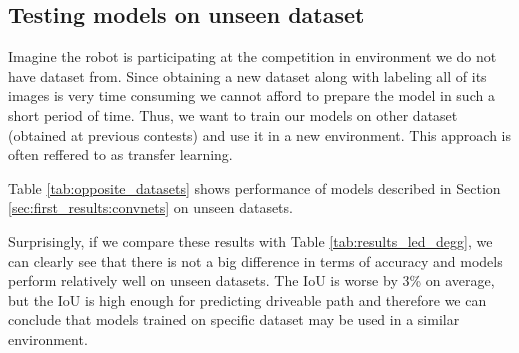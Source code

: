 \newpage

\subsection{Testing models on unseen dataset}
\label{sec:first_results:oppositedataset}

Imagine the robot is participating at the competition in environment we do not have dataset
from. Since obtaining a new dataset along with labeling all of its images is very time
consuming we cannot afford to prepare the model in such a short period of time.
Thus, we want to train our models on other dataset (obtained at previous contests)
and use it in a new environment. This approach is often reffered to as transfer learning.

Table \ref{tab:opposite_datasets} shows performance of models described in Section
\ref{sec:first_results:convnets} on unseen datasets.

Surprisingly, if we compare these results with Table \ref{tab:results_led_degg},
we can clearly see that there is not a big difference in terms of accuracy and
models perform relatively well on unseen datasets. The IoU is worse by 3\% on average, but
the IoU is high enough for predicting driveable path
and therefore we can conclude that models trained on specific dataset may be used in
a similar environment.


